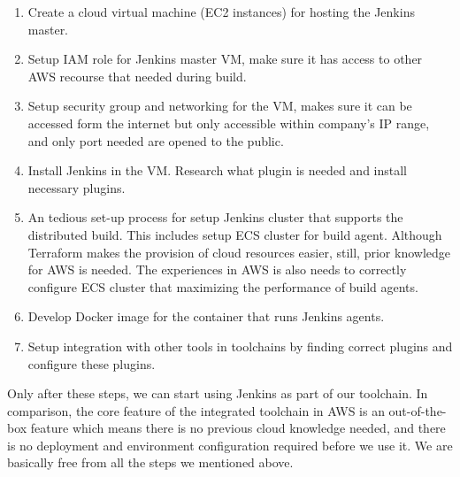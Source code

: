 \begin{enumerate} 
 \item Create a cloud virtual machine (EC2 instances) for hosting the Jenkins master.
 \item Setup IAM role for Jenkins master VM, make sure it has access to other AWS recourse that needed during build.
 \item Setup security group and networking for the VM, makes sure it can be accessed form the internet but only accessible within company's IP range, and only port needed are opened to the public.
 \item Install Jenkins in the VM. Research what plugin is needed and install necessary plugins.
 \item An tedious set-up process for setup Jenkins cluster that supports the distributed build. This includes setup ECS cluster for build agent. Although Terraform makes the provision of cloud resources easier, still, prior knowledge for AWS is needed. The experiences in AWS is also needs to correctly configure ECS cluster that maximizing the performance of build agents.
 \item Develop Docker image for the container that runs Jenkins agents.
 \item Setup integration with other tools in toolchains by finding correct plugins and configure these plugins. 
\end{enumerate}
Only after these steps, we can start using Jenkins as part of our toolchain.
In comparison, the core feature of the integrated toolchain in AWS is an out-of-the-box feature which means there is no previous cloud knowledge needed, and there is no deployment and environment configuration required before we use it. We are basically free from all the steps we mentioned above.
